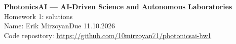 \documentclass[11pt,a4paper]{article}
\newcommand{\studentname}{Erik Mirzoyan}  %
\newcommand{\repourl}{https://github.com/10mirzoyan71/photonicsai-hw1}
\begin{document}
\begin{center}
{\Large\bfseries PhotonicsAI --- AI-Driven Science and Autonomous Laboratories}\\[3pt]
{\large Homework 1: solutions}\\[6pt]
Name: \studentname \qquad Due 11.10.2026\\[2pt]
Code repository: \url{\repourl}
\end{center}



\end{document}
